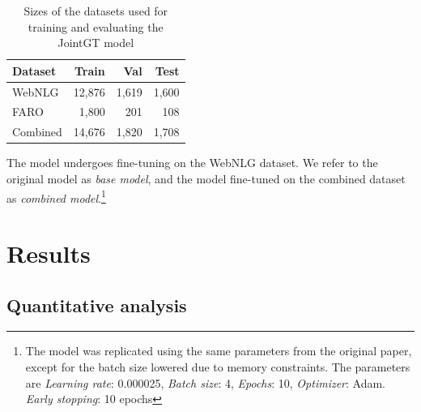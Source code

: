 \documentclass[
hf, %
]{ceurart}
\begin{document}
\begin{table}[h]
	\caption{Sizes of the datasets used for training and evaluating the JointGT model}
	\centering
	\begin{tabular}{|l|r|r|r|}
		\hline
		\textbf{Dataset} & \textbf{Train} & \textbf{Val} & \textbf{Test} \\ \hline
		WebNLG           & 12,876         & 1,619        & 1,600         \\ \hline
		FARO             & 1,800          & 201          & 108           \\ \hline
		Combined         & 14,676         & 1,820        & 1,708         \\ \hline
	\end{tabular}

	\label{tab:splits_dataset_jointgt}
\end{table}

The model undergoes fine-tuning on the WebNLG dataset. We refer to the original model as \textit{base model}, and the model fine-tuned on the combined dataset as \textit{combined model}.\footnote{The model was replicated using the same parameters from the original paper, except for the batch size lowered due to memory constraints. The parameters are \textit{Learning rate}: 0.000025, \textit{Batch size}: 4, \textit{Epochs}: 10, \textit{Optimizer}: Adam. \textit{Early stopping}: 10 epochs}

\section{Results}
\label{sec:results_jointGT}

\subsection{Quantitative analysis}

\end{document}
